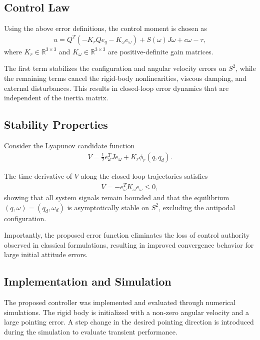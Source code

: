 \subsection{Control Law}

Using the above error definitions, the control moment is chosen as
\begin{align}
u =
Q^T\left(
- K_r Q e_q
- K_\omega e_\omega
\right)
+ S(\omega) J \omega
+ c \omega
- \tau,
\end{align}
where \( K_r \in \mathbb{R}^{3\times3} \) and \( K_\omega \in \mathbb{R}^{3\times3} \) are positive-definite gain matrices.

The first term stabilizes the configuration and angular velocity errors on \( S^2 \), while the remaining terms cancel the rigid-body nonlinearities, viscous damping, and external disturbances. This results in closed-loop error dynamics that are independent of the inertia matrix.

\subsection{Stability Properties}

Consider the Lyapunov candidate function
\begin{align}
V = \frac{1}{2} e_\omega^T J e_\omega + K_r \phi_r(q, q_d).
\end{align}

The time derivative of \( V \) along the closed-loop trajectories satisfies
\begin{align}
\dot{V} = - e_\omega^T K_\omega e_\omega \le 0,
\end{align}
showing that all system signals remain bounded and that the equilibrium
\(
(q,\omega) = (q_d,\omega_d)
\)
is asymptotically stable on \( S^2 \), excluding the antipodal configuration.

Importantly, the proposed error function eliminates the loss of control authority observed in classical formulations, resulting in improved convergence behavior for large initial attitude errors.

\subsection{Implementation and Simulation}

The proposed controller was implemented and evaluated through numerical simulations. The rigid body is initialized with a non-zero angular velocity and a large pointing error. A step change in the desired pointing direction is introduced during the simulation to evaluate transient performance.

